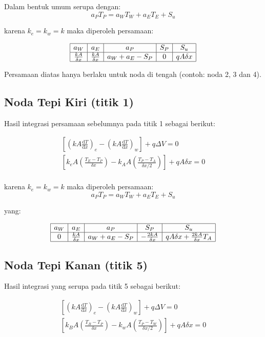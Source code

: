 \documentclass[11pt]{article}
\begin{document}
Dalam bentuk umum serupa dengan: \[a_P T_P = a_W T_W+a_E T_E + S_u\]

karena \(k_e = k_w = k\) maka diperoleh persamaan:

\[\begin{array}{|c|c|c|c|c|}\hline a_W & a_E & a_P & S_P & S_u \\
\hline
\frac{k A}{\delta x} & \frac{k A}{\delta x} & a_W+a_E-S_P & 0 & qA\delta x \\ \hline
\end{array}
\]

Persamaan diatas hanya berlaku untuk noda di tengah (contoh: noda 2, 3
dan 4).

\subsection{Noda Tepi Kiri (titik 1)}\label{noda-tepi-kiri-titik-1}

Hasil integrasi persamaan sebelumnya pada titik 1 sebagai berikut:

\[\begin{aligned}
\left[ \left( k A \frac{\text{d}T}{\text{d}x} \right)_e -
\left( k A \frac{\text{d}T}{\text{d}x} \right)_w \right] 
+q \Delta V = 0 \\
\left[ k_e A \left(\frac{T_E-T_P}{\delta x} \right) - k_A A \left(\frac{T_P-T_A}{\delta x/2} \right) \right]
+ q A \delta x = 0 \\
\end{aligned}\]

karena \(k_e = k_w = k\) maka diperoleh persamaan:
\[a_P T_P = a_W T_W+a_E T_E + S_u\]

yang:

\[\begin{array}{|c|c|c|c|c|}\hline a_W & a_E & a_P & S_P & S_u \\
\hline
0 & \frac{k A}{\delta x} & a_W+a_E-S_P & -\frac{2kA}{\delta x} & qA\delta x + \frac{2kA}{\delta x}T_A \\ \hline
\end{array}\]

\subsection{Noda Tepi Kanan (titik 5)}\label{noda-tepi-kanan-titik-5}

Hasil integrasi yang serupa pada titik 5 sebagai berikut:

\[\begin{aligned}
\left[ \left( k A \frac{\text{d}T}{\text{d}x} \right)_e -
\left( k A \frac{\text{d}T}{\text{d}x} \right)_w \right] 
+q \Delta V = 0 \\
\left[ k_B A \left(\frac{T_B-T_P}{\delta x} \right) - k_w A \left(\frac{T_P-T_W}{\delta x/2} \right) \right]
+ q A \delta x = 0 \\
\end{aligned}\]
\end{document}
